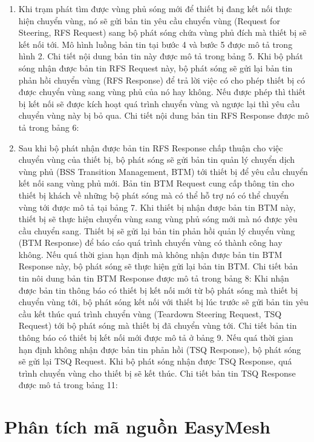 \begin{enumerate}
\item Khi trạm phát tìm được vùng phủ sóng mới để thiết bị đang kết nối thực hiện chuyển vùng, nó sẽ gửi bản tin yêu cầu chuyển vùng (Request for Steering, RFS Request) sang bộ phát sóng chứa vùng phủ đích mà thiết bị sẽ kết nối tới. Mô hình luồng bản tin tại bước 4 và bước 5 được mô tả trong hình 2. Chi tiết nội dung bản tin này được mô tả trong bảng 5.
Khi bộ phát sóng nhận được bản tin RFS Request này, bộ phát sóng sẽ gửi lại bản tin phản hồi chuyển vùng (RFS Response) để trả lời việc có cho phép thiết bị có được chuyển vùng sang vùng phủ của nó hay không. Nếu được phép thì thiết bị kết nối sẽ được kích hoạt quá trình chuyển vùng và ngược lại thì yêu cầu chuyển vùng này bị bỏ qua. Chi tiết nội dung bản tin RFS Response được mô tả trong bảng 6:
\item Sau khi bộ phát nhận được bản tin RFS Response chấp thuận cho việc chuyển vùng của thiết bị, bộ phát sóng sẽ gửi bản tin quản lý chuyển dịch vùng phủ (BSS Transition Management, BTM) tới thiết bị để yêu cầu chuyển kết nối sang vùng phủ mới. Bản tin BTM Request cung cấp thông tin cho thiết bị khách về những bộ phát sóng mà có thể hỗ trợ nó có thể chuyển vùng tới được mô tả tại bảng 7. Khi thiết bị nhận được bản tin BTM này, thiết bị sẽ thực hiện chuyển vùng sang vùng phủ sóng mới mà nó được yêu cầu chuyển sang. Thiết bị sẽ gửi lại bản tin phản hồi quản lý chuyển vùng (BTM Response) để báo cáo quá trình chuyển vùng có thành công hay không. Nếu quá thời gian hạn định mà không nhận được bản tin BTM Response này, bộ phát sóng sẽ thực hiện gửi lại bản tin BTM. Chi tiết bản tin nôi dung bản tin BTM Response được mô tả trong bảng 8: Khi nhận được bản tin thông báo có thiết bị kết nối mới từ bộ phát sóng mà thiết bị chuyển vùng tới, bộ phát sóng kết nối với thiết bị lúc trước sẽ gửi bản tin yêu cầu kết thúc quá trình chuyển vùng (Teardown Steering Request, TSQ Request) tới bộ phát sóng mà thiết bị đã chuyển vùng tới. Chi tiết bản tin thông báo có thiết bị kết nối mới được mô tả ở bảng 9. Nếu quá thời gian hạn định không nhận được bản tin phản hồi (TSQ Response), bộ phát sóng sẽ gửi lại TSQ Request. Khi bộ phát sóng nhận được TSQ Response, quá trình chuyển vùng cho thiết bị sẽ kết thúc. Chi tiết bản tin TSQ Response được mô tả trong bảng 11:
\end{enumerate}

\section{Phân tích mã nguồn EasyMesh}